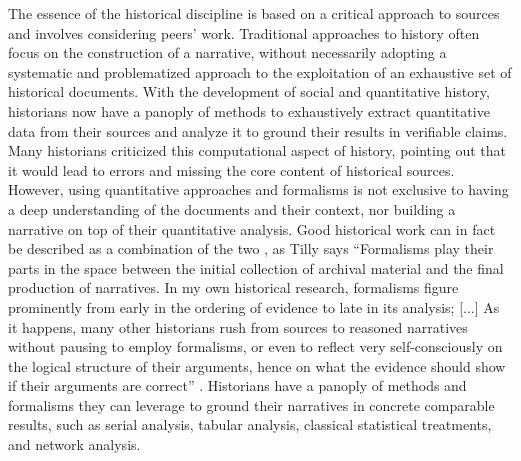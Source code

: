 

The essence of the historical discipline is based on a critical approach to sources and involves considering peers' work.
Traditional approaches to history often focus on the construction of a narrative, without necessarily adopting a systematic and problematized approach to the exploitation of an exhaustive set of historical documents\cite{tillyObservationsSocialProcesses2004}.
With the development of social and quantitative history, historians now have a panoply of methods to exhaustively extract quantitative data from their sources and analyze it to ground their results in verifiable claims.
Many historians criticized this computational aspect of history\cite{lepetitHistoireQuantitativeDeux1989, fogelLimitsQuantitativeMethods1975, barnesBigDataLittle2013}, pointing out that it would lead to errors and missing the core content of historical sources.
However, using quantitative approaches and formalisms is not exclusive to having a deep understanding of the documents and their context, nor building a narrative on top of their quantitative analysis.
Good historical work can in fact be described as a combination of the two \cite{karila-cohenNouvellesCuisinesHistoire2018}, as Tilly says ``Formalisms play their parts in the space between the initial collection of archival material and the final production of narratives. In my own historical research, formalisms figure prominently from early in the ordering of evidence to late in its analysis; [...] As it happens, many other historians rush from sources to reasoned narratives without pausing to employ formalisms, or even to reflect very self-consciously on the logical structure of their arguments, hence on what the evidence should show if their arguments are correct'' \cite{tillyObservationsSocialProcesses2004}.
Historians have a panoply of methods and formalisms they can leverage to ground their narratives in concrete comparable results, such as serial analysis, tabular analysis, classical statistical treatments, and network analysis.

